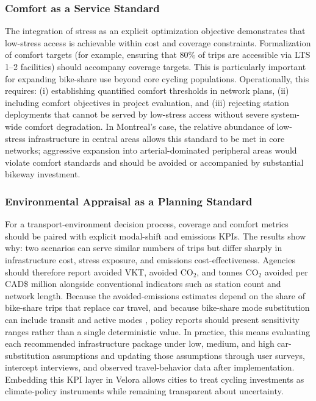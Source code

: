 \documentclass[preprint,authoryear,10pt]{elsarticle}
\begin{document}
\subsubsection{Comfort as a Service Standard}

The integration of stress as an explicit optimization objective demonstrates that low-stress access is achievable within cost and coverage constraints. Formalization of comfort targets (for example, ensuring that 80\% of trips are accessible via LTS 1--2 facilities) should accompany coverage targets. This is particularly important for expanding bike-share use beyond core cycling populations. Operationally, this requires: (i) establishing quantified comfort thresholds in network plans, (ii) including comfort objectives in project evaluation, and (iii) rejecting station deployments that cannot be served by low-stress access without severe system-wide comfort degradation. In Montreal's case, the relative abundance of low-stress infrastructure in central areas allows this standard to be met in core networks; aggressive expansion into arterial-dominated peripheral areas would violate comfort standards and should be avoided or accompanied by substantial bikeway investment.

\subsubsection{Environmental Appraisal as a Planning Standard}

For a transport-environment decision process, coverage and comfort metrics should be paired with explicit modal-shift and emissions KPIs. The results show why: two scenarios can serve similar numbers of trips but differ sharply in infrastructure cost, stress exposure, and emissions cost-effectiveness. Agencies should therefore report avoided VKT, avoided CO$_2$, and tonnes CO$_2$ avoided per CAD\$ million alongside conventional indicators such as station count and network length. Because the avoided-emissions estimates depend on the share of bike-share trips that replace car travel, and because bike-share mode substitution can include transit and active modes \citep{fuller2013potential, saltykova2022environmental}, policy reports should present sensitivity ranges rather than a single deterministic value. In practice, this means evaluating each recommended infrastructure package under low, medium, and high car-substitution assumptions and updating those assumptions through user surveys, intercept interviews, and observed travel-behavior data after implementation. Embedding this KPI layer in Velora allows cities to treat cycling investments as climate-policy instruments while remaining transparent about uncertainty.
\end{document}
